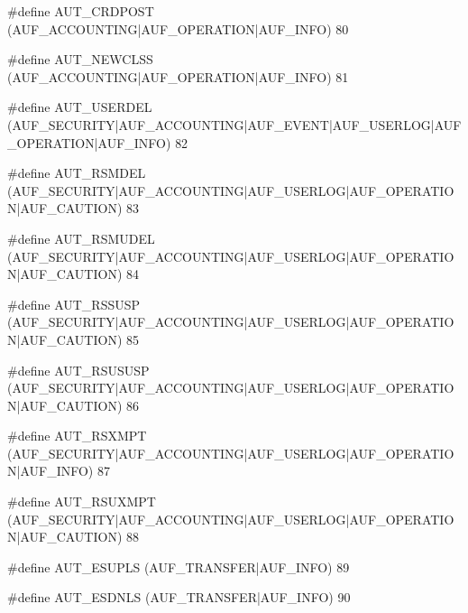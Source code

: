 \documentclass{article}
\begin{document}
\begin{cxxmacro}
{\#define}
        {AUT\_CRDPOST}
        {(AUF\_ACCOUNTING|AUF\_OPERATION|AUF\_INFO)}
        {}
        {80}
\end{cxxmacro}
\begin{cxxmacro}
{\#define}
        {AUT\_NEWCLSS}
        {(AUF\_ACCOUNTING|AUF\_OPERATION|AUF\_INFO)}
        {}
        {81}
\end{cxxmacro}
\begin{cxxmacro}
{\#define}
        {AUT\_USERDEL}
        {(AUF\_SECURITY|AUF\_ACCOUNTING|AUF\_EVENT|AUF\_USERLOG|AUF\_OPERATION|AUF\_INFO)}
        {}
        {82}
\end{cxxmacro}
\begin{cxxmacro}
{\#define}
        {AUT\_RSMDEL}
        {(AUF\_SECURITY|AUF\_ACCOUNTING|AUF\_USERLOG|AUF\_OPERATION|AUF\_CAUTION)}
        {}
        {83}
\end{cxxmacro}
\begin{cxxmacro}
{\#define}
        {AUT\_RSMUDEL}
        {(AUF\_SECURITY|AUF\_ACCOUNTING|AUF\_USERLOG|AUF\_OPERATION|AUF\_CAUTION)}
        {}
        {84}
\end{cxxmacro}
\begin{cxxmacro}
{\#define}
        {AUT\_RSSUSP}
        {(AUF\_SECURITY|AUF\_ACCOUNTING|AUF\_USERLOG|AUF\_OPERATION|AUF\_CAUTION)}
        {}
        {85}
\end{cxxmacro}
\begin{cxxmacro}
{\#define}
        {AUT\_RSUSUSP}
        {(AUF\_SECURITY|AUF\_ACCOUNTING|AUF\_USERLOG|AUF\_OPERATION|AUF\_CAUTION)}
        {}
        {86}
\end{cxxmacro}
\begin{cxxmacro}
{\#define}
        {AUT\_RSXMPT}
        {(AUF\_SECURITY|AUF\_ACCOUNTING|AUF\_USERLOG|AUF\_OPERATION|AUF\_INFO)}
        {}
        {87}
\end{cxxmacro}
\begin{cxxmacro}
{\#define}
        {AUT\_RSUXMPT}
        {(AUF\_SECURITY|AUF\_ACCOUNTING|AUF\_USERLOG|AUF\_OPERATION|AUF\_CAUTION)}
        {}
        {88}
\end{cxxmacro}
\begin{cxxmacro}
{\#define}
        {AUT\_ESUPLS}
        {(AUF\_TRANSFER|AUF\_INFO)}
        {}
        {89}
\end{cxxmacro}
\begin{cxxmacro}
{\#define}
        {AUT\_ESDNLS}
        {(AUF\_TRANSFER|AUF\_INFO)}
        {}
        {90}
\end{cxxmacro}
\end{document}
